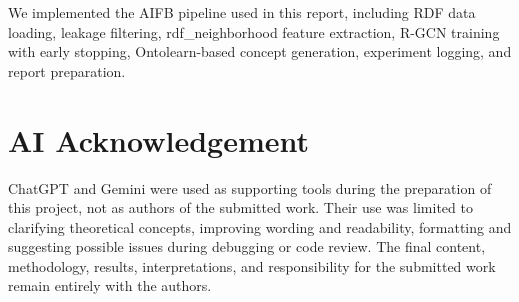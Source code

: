 \documentclass[runningheads]{llncs}
\begin{document}
We implemented the AIFB pipeline used in this report, including RDF data loading, leakage filtering,
rdf\_neighborhood feature extraction, R-GCN training with early stopping, Ontolearn-based concept
generation, experiment logging, and report preparation.

\section*{AI Acknowledgement}
{}

ChatGPT and Gemini were used as supporting tools during the preparation of this project,
not as authors of the submitted work.  Their use was limited to clarifying theoretical concepts,
improving wording and readability, formatting and
suggesting possible issues during debugging or code review.  The final content, methodology,
results, interpretations, and responsibility for the submitted work remain entirely with the authors.
\end{document}
